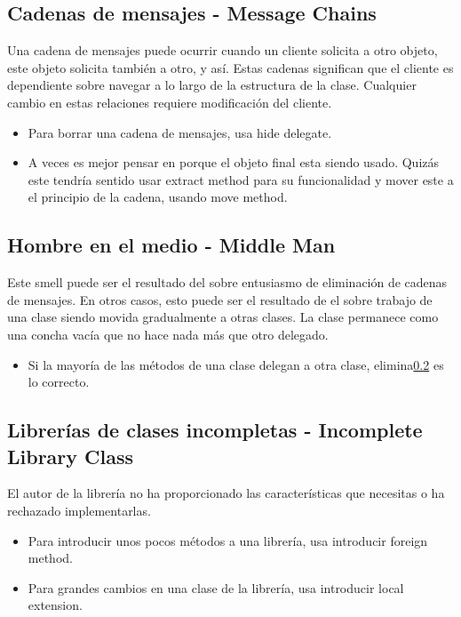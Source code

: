 \documentclass[11pt,a4paper,oneside]{book}
\begin{document}
\subsection{Cadenas de mensajes - Message Chains}
\label{messagechains}
Una cadena de mensajes puede ocurrir cuando un cliente solicita a otro objeto, este objeto solicita también a otro, y así. Estas cadenas significan que el cliente es dependiente sobre navegar a lo largo de la estructura de la clase. Cualquier cambio en estas relaciones requiere modificación del cliente.
\newline
\begin{itemize}
    \item Para borrar una cadena de mensajes, usa hide delegate.
    \item A veces es mejor pensar en porque el objeto final esta siendo usado. Quizás este tendría sentido usar extract method para su funcionalidad y mover este a el principio de la cadena, usando move method.
\end{itemize}
    
\subsection{Hombre en el medio - Middle Man}
\label{middleman}
Este smell puede ser el resultado del sobre entusiasmo de eliminación de cadenas de mensajes.
\newline
En otros casos, esto puede ser el resultado de el sobre trabajo de una clase siendo movida gradualmente a otras clases. La clase permanece como una concha vacía que no hace nada más que otro delegado.
\begin{itemize}
    \item Si la mayoría de las métodos de una clase delegan a otra clase, elimina\ref{middleman} es lo correcto.
\end{itemize}

\subsection{Librerías de clases incompletas - Incomplete Library Class}
\label{incompletelibraryclass}
El autor de la librería no ha proporcionado las características que necesitas o ha rechazado implementarlas.
\begin{itemize}
    \item Para introducir unos pocos métodos a una librería, usa introducir foreign method.
    \item Para grandes cambios en una clase de la librería, usa introducir local extension.
\end{itemize}
\end{document}
